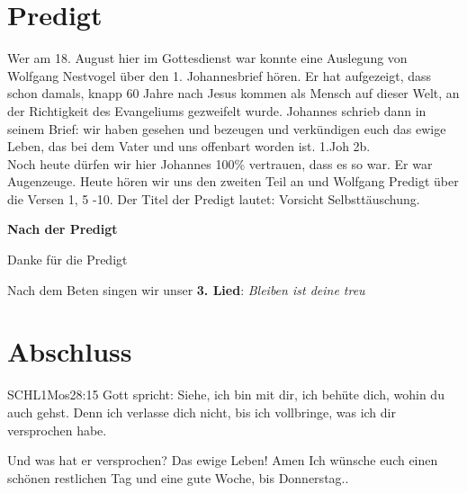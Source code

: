 \documentclass{../inc/mybib}
\begin{document}
\section{Predigt}
Wer am 18. August hier im Gottesdienst war konnte eine Auslegung von Wolfgang Nestvogel über den 1. Johannesbrief hören. Er hat aufgezeigt, dass schon damals, knapp 60 Jahre nach Jesus kommen als Mensch auf dieser Welt, an der Richtigkeit des Evangeliums gezweifelt wurde. Johannes schrieb dann in seinem Brief: wir haben gesehen und bezeugen und verkündigen euch das ewige Leben, das bei dem Vater und uns offenbart worden ist. 1.Joh 2b.\\
Noch heute dürfen wir hier Johannes 100\% vertrauen, dass es so war. Er war Augenzeuge. Heute hören wir uns den zweiten Teil an und Wolfgang Predigt über die Versen 1, 5 -10. Der Titel der Predigt lautet: Vorsicht Selbsttäuschung.

\textbf{Nach der Predigt}

Danke für die Predigt

Nach dem Beten singen wir unser \textbf{3. Lied}: \textit{Bleiben ist deine treu}\\

\section{Abschluss}

\begin{bibelbox}{SCHL}{1Mos}{28:15}
Gott spricht: Siehe, ich bin mit dir,
ich behüte dich, wohin du auch gehst.
Denn ich verlasse dich nicht,
bis ich vollbringe, was ich dir versprochen habe.
\end{bibelbox}
Und was hat er versprochen? Das ewige Leben!
Amen
Ich wünsche euch einen schönen restlichen Tag und eine gute Woche, bis Donnerstag..
\end{document}
